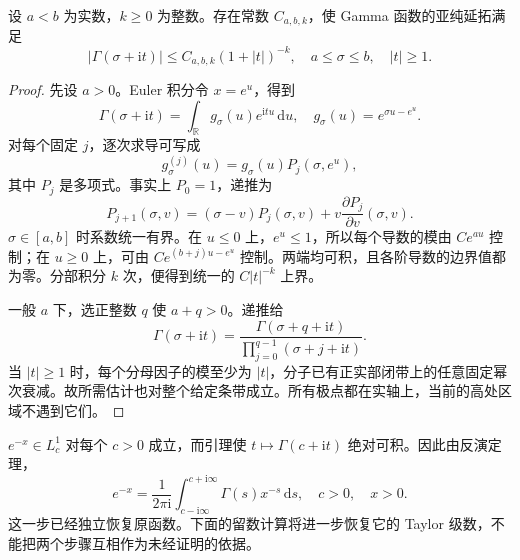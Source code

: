 \begin{lemma}\label{b3:lem:21-gamma-strip-decay}
设 \(a<b\) 为实数，\(k\ge0\) 为整数。存在常数 \(C_{a,b,k}\)，使 Gamma 函数的亚纯延拓满足
\[
 |\Gamma(\sigma+\mathrm it)|\le C_{a,b,k}(1+|t|)^{-k},
 \quad a\le\sigma\le b,\quad |t|\ge1.
\]
\end{lemma}
\begin{proof}
先设 \(a>0\)。Euler 积分令 \(x=e^u\)，得到
\[
 \Gamma(\sigma+\mathrm it)
 =\int_{\mathbb R}g_\sigma(u)e^{\mathrm itu}\,\mathrm du,
 \quad g_\sigma(u)=e^{\sigma u-e^u}.
\]
对每个固定 \(j\)，逐次求导可写成
\[
 g_\sigma^{(j)}(u)=g_\sigma(u)P_j(\sigma,e^u),
\]
其中 \(P_j\) 是多项式。事实上 \(P_0=1\)，递推为
\[
 P_{j+1}(\sigma,v)=(\sigma-v)P_j(\sigma,v)
                         +v\frac{\partial P_j}{\partial v}(\sigma,v).
\]
\(\sigma\in[a,b]\) 时系数统一有界。在 \(u\le0\) 上，\(e^u\le1\)，所以每个导数的模由 \(Ce^{au}\) 控制；在 \(u\ge0\) 上，可由 \(Ce^{(b+j)u-e^u}\) 控制。两端均可积，且各阶导数的边界值都为零。分部积分 \(k\) 次，便得到统一的 \(C|t|^{-k}\) 上界。

一般 \(a\) 下，选正整数 \(q\) 使 \(a+q>0\)。递推给
\[
 \Gamma(\sigma+\mathrm it)
 =\frac{\Gamma(\sigma+q+\mathrm it)}
         {\prod_{j=0}^{q-1}(\sigma+j+\mathrm it)}.
\]
当 \(|t|\ge1\) 时，每个分母因子的模至少为 \(|t|\)，分子已有正实部闭带上的任意固定幂次衰减。故所需估计也对整个给定条带成立。所有极点都在实轴上，当前的高处区域不遇到它们。
\end{proof}

\(e^{-x}\in L^1_c\) 对每个 \(c>0\) 成立，而引理使 \(t\mapsto\Gamma(c+\mathrm it)\) 绝对可积。因此由反演定理，
\begin{equation}\label{b3:eq:21-exponential-inversion}
 e^{-x}=\frac1{2\pi\mathrm i}
       \int_{c-\mathrm i\infty}^{c+\mathrm i\infty}\Gamma(s)x^{-s}\,\mathrm ds,
 \quad c>0,\quad x>0.
\end{equation}
这一步已经独立恢复原函数。下面的留数计算将进一步恢复它的 Taylor 级数，不能把两个步骤互相作为未经证明的依据。

